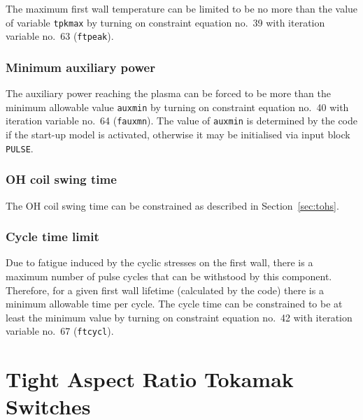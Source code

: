 The maximum first wall temperature can be limited to be no more than the value
of variable {\tt tpkmax} by turning on constraint equation no.\ 39 with
iteration variable no.\ 63 ({\tt ftpeak}).

\subsubsection{Minimum auxiliary power}

The auxiliary power reaching the plasma can be forced to be more than the
minimum allowable value {\tt auxmin} by turning on constraint equation no.\ 40
with iteration variable no.\ 64 ({\tt fauxmn}). The value of {\tt auxmin} is
determined by the code if the start-up model is activated, otherwise it may be
initialised via input block {\tt PULSE}.

\subsubsection{OH coil swing time}

The OH coil swing time can be constrained as described in
Section~\ref{sec:tohs}.

\subsubsection{Cycle time limit}

Due to fatigue induced by the cyclic stresses on the first wall, there is a
maximum number of pulse cycles that can be withstood by this component.
Therefore, for a given first wall lifetime (calculated by the code) there is a
minimum allowable time per cycle. The cycle time can be constrained to be at
least the minimum value by turning on constraint equation no.\ 42 with
iteration variable no.\ 67 ({\tt ftcycl}).

\section{Tight Aspect Ratio Tokamak Switches}

